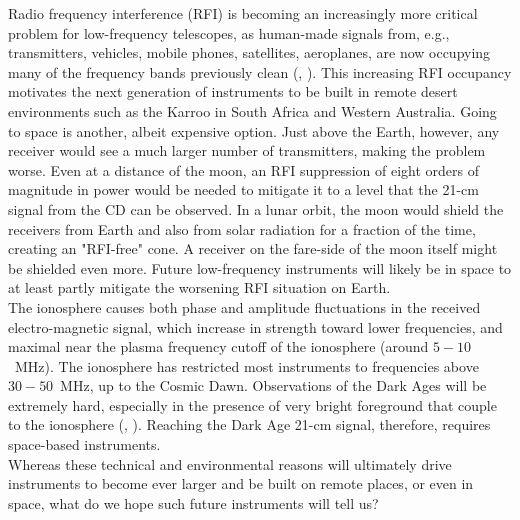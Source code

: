  Radio frequency interference (RFI) is becoming an increasingly more critical problem for low-frequency telescopes, as human-made signals from, e.g., transmitters, vehicles, mobile phones, satellites, aeroplanes, are now occupying many of the frequency bands previously clean (\cite{offringa13}, \cite{offringa15}). This increasing RFI occupancy motivates the next generation of instruments to be built in remote desert environments such as the Karroo in South Africa and Western Australia. Going to space is another, albeit expensive option. Just above the Earth, however, any receiver would see a much larger number of transmitters, making the problem worse. Even at a distance of the moon, an RFI suppression of eight orders of magnitude in power would be needed to mitigate it to a level that the 21-cm signal from the CD can be observed. In a lunar orbit, the moon would shield the receivers from Earth and also from solar radiation for a fraction of the time, creating an "RFI-free" cone.
A receiver on the fare-side of the moon itself might be shielded even more. 
Future low-frequency instruments will likely be in space to at least partly mitigate the worsening RFI situation on Earth. \\

 The ionosphere causes both phase and amplitude fluctuations in the received electro-magnetic signal, which increase in strength toward lower frequencies, and maximal near the plasma frequency cutoff of the ionosphere (around $5-10$~MHz). The ionosphere has restricted most instruments to frequencies above $30-50$~MHz, up to the Cosmic Dawn. Observations of the Dark Ages will be extremely hard, especially in the presence of very bright foreground that couple to the ionosphere (\cite{vedantham15}, \cite{vedantham16}). Reaching the Dark Age 21-cm signal, therefore, requires space-based instruments. \\

\noindent Whereas these technical and environmental reasons will ultimately drive instruments to become ever larger and be built on remote places, or even in space, what do we hope such future instruments will tell us?


